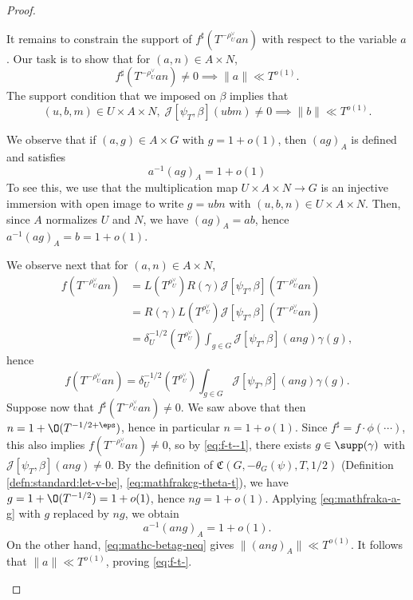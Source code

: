 \begin{proof}
\begin{enumerate}[(i)]
    It remains to constrain the support of $f^\sharp (T^{- \rho_U^\vee } a n)$ with respect to the variable $a$.
    Our task is to show that for $(a,n) \in A \times N$,
    \begin{equation}\label{eq:f-t-}
      f^\sharp (T^{- \rho_U^\vee } a n) \neq 0
      \implies
      \|a\| \ll T^{o(1)}.
    \end{equation}
    The support condition that we imposed on $\beta$ implies that
    \begin{equation}\label{eq:mathc-betag-neq}
      (u,b,m) \in U \times A \times N,\;
      \mathcal{J}[\psi_T,\beta](u b m) \neq 0
      \implies
      \|b\| \ll T^{o(1)}.
    \end{equation}

    We observe that if $(a,g) \in A \times G$ with $g = 1 + o(1)$, then $(a g)_A$ is defined and satisfies
    \begin{equation}\label{eq:mathfraka-a-g}
      a^{-1} (a g)_A = 1 + o(1)
    \end{equation}
    To see this, we use that the multiplication map $U \times A \times N \rightarrow G$ is an injective immersion with open image to write $g = u b n$ with $(u,b,n) \in U \times A \times N$.  Then, since $A$ normalizes $U$ and $N$, we have $(a g)_A = a b$, hence $a^{-1} (a g)_A = b = 1 + o(1)$.

    We observe next that for $(a,n) \in A \times N$,
    \begin{align*}
      f(T^{- \rho_U^\vee } a n)
      &= L(T^{\rho_U^\vee}) R(\gamma) \mathcal{J}[\psi_T,\beta](T^{- \rho_U^\vee } a n)
      \\
      &=
        R(\gamma) L(T^{\rho_U^\vee})  \mathcal{J}[\psi_T,\beta](T^{- \rho_U^\vee } a n)
      \\
      &=
        \delta_U^{-1/2}(T^{\rho_U^\vee})
        \int_{g \in G}  \mathcal{J}[\psi_T,\beta]( a n g) \gamma(g),
    \end{align*}
    hence
    \begin{equation}\label{eq:f-t--1}
      f(T^{- \rho_U^\vee } a n)
      =
      \delta_U^{-1/2}(T^{\rho_U^\vee})
      \int_{g \in G}
      \mathcal{J}[\psi_T,\beta](a n g) \gamma(g).
    \end{equation}
    Suppose now that $f^\sharp(T^{-\rho_U^\vee} a n) \neq 0$.  We saw above that then $n = 1 + \O(T^{-1/2+\eps})$, hence in particular $n = 1 + o(1)$.  Since $f^\sharp = f \cdot \phi(\cdots)$, this also implies $f(T^{-\rho_U^\vee} a n) \neq 0$, so by \eqref{eq:f-t--1}, there exists $g \in \supp(\gamma)$ with $\mathcal{J}[\psi_T,\beta](a n g) \neq 0$.  By the definition of $\mathfrak{C}(G,-\theta_G(\psi),T,1/2)$ (Definition \ref{defn:standard:let-v-be}, \eqref{eq:mathfrakcg-theta-t}), we have $g = 1 + \O(T^{-1/2}) = 1 + o(1)$, hence $n g = 1 + o(1)$.
    Applying \eqref{eq:mathfraka-a-g} with $g$ replaced by $n g$, we obtain
    \begin{equation*}
      a^{-1} (a n g)_A = 1 + o(1).
    \end{equation*}
    On the other hand, \eqref{eq:mathc-betag-neq} gives $\|(a n g)_A\| \ll T^{o(1)}$.  It follows that $\|a\| \ll T^{o(1)}$, proving \eqref{eq:f-t-}.


\end{enumerate}
\end{proof}
